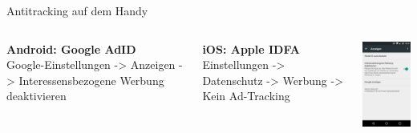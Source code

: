 \begin{frame}{Antitracking auf dem Handy}
  \begin{columns}
    \column{5.5cm}
    \footnotesize

    \textbf{Android: Google AdID}\\
    Google-Einstellungen -> Anzeigen -> Interessensbezogene Werbung deaktivieren\\
    \vspace{0.5cm}

    \textbf{iOS: Apple IDFA}\\
    Einstellungen -> Datenschutz -> Werbung -> Kein Ad-Tracking\\
    \vspace{0.5cm}

    \column{5cm}

    \begin{center}
      \includegraphics[width=3.5cm]{../../img/google-adid.png}
    \par\end{center}
  \end{columns}
\end{frame}
